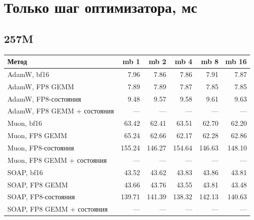 \documentclass[10pt]{article}
\begin{document}
\section{Только шаг оптимизатора, мс}
\subsection{257M}
\begin{center}
\small
\begin{tabular}{lrrrrr}
\toprule
\textbf{Метод} & \textbf{mb 1} & \textbf{mb 2} & \textbf{mb 4} & \textbf{mb 8} & \textbf{mb 16} \\
\midrule
AdamW, bf16 & 7.96 & 7.86 & 7.86 & 7.91 & 7.87 \\
AdamW, FP8 GEMM & 7.89 & 7.89 & 7.87 & 7.85 & 7.85 \\
AdamW, FP8-состояния & 9.48 & 9.57 & 9.58 & 9.61 & 9.63 \\
AdamW, FP8 GEMM + состояния & --- & --- & --- & --- & --- \\
Muon, bf16 & 63.42 & 62.41 & 63.51 & 62.70 & 62.20 \\
Muon, FP8 GEMM & 65.24 & 62.66 & 62.17 & 62.28 & 62.86 \\
Muon, FP8-состояния & 155.24 & 146.27 & 154.64 & 146.63 & 148.10 \\
Muon, FP8 GEMM + состояния & --- & --- & --- & --- & --- \\
SOAP, bf16 & 43.52 & 43.62 & 43.83 & 43.86 & 43.81 \\
SOAP, FP8 GEMM & 43.66 & 43.76 & 43.55 & 43.81 & 43.48 \\
SOAP, FP8-состояния & 139.71 & 141.39 & 138.32 & 142.13 & 140.63 \\
SOAP, FP8 GEMM + состояния & --- & --- & --- & --- & --- \\
\bottomrule
\end{tabular}
\end{center}
\end{document}
